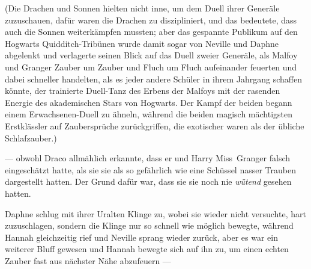 (Die Drachen und Sonnen hielten nicht inne, um dem Duell ihrer Generäle zuzuschauen, dafür waren die Drachen zu diszipliniert, und das bedeutete, dass auch die Sonnen weiterkämpfen mussten; aber das gespannte Publikum auf den Hogwarts Quidditch-Tribünen wurde damit sogar von Neville und Daphne abgelenkt und verlagerte seinen Blick auf das Duell zweier Generäle, als Malfoy und Granger Zauber um Zauber und Fluch um Fluch aufeinander feuerten und dabei schneller handelten, als es jeder andere Schüler in ihrem Jahrgang schaffen könnte, der trainierte Duell-Tanz des Erbens der Malfoys mit der rasenden Energie des akademischen Stars von Hogwarts. Der Kampf der beiden begann einem Erwachsenen-Duell zu ähneln, während die beiden magisch mächtigsten Erstklässler auf Zaubersprüche zurückgriffen, die exotischer waren als der übliche Schlafzauber.)

— obwohl Draco allmählich erkannte, dass er und Harry Miss~Granger falsch eingeschätzt hatte, als sie sie als so gefährlich wie eine Schüssel nasser Trauben dargestellt hatten. Der Grund dafür war, dass sie sie noch nie \emph{wütend} gesehen hatten.

\later

Daphne schlug mit ihrer Uralten Klinge zu, wobei sie wieder nicht versuchte, hart zuzuschlagen, sondern die Klinge nur so schnell wie möglich bewegte, während Hannah gleichzeitig  rief und Neville sprang wieder zurück, aber es war ein weiterer Bluff gewesen und Hannah bewegte sich auf ihn zu, um einen echten Zauber fast aus nächster Nähe abzufeuern —

